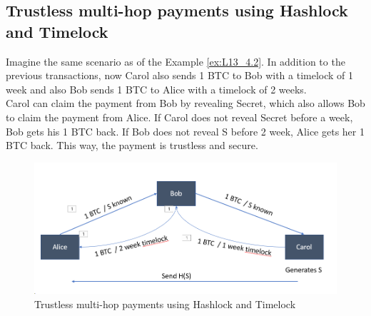 \subsection{Trustless multi-hop payments using Hashlock and Timelock}
Imagine the same scenario as of the Example \ref{ex:L13_4.2}. In addition to the previous transactions, now Carol also sends 1 BTC to Bob with a timelock of 1 week and also Bob sends 1 BTC to Alice with a timelock of 2 weeks. \\
Carol can claim the payment from Bob by revealing Secret, which also allows Bob to claim the payment from Alice. If Carol does not reveal Secret before a week, Bob gets his 1 BTC back. If Bob does not reveal S before 2 week, Alice gets her 1 BTC back. This way, the payment is trustless and secure.
\begin{figure}[h!]
	\centering
	\includegraphics[width=0.6\linewidth]{Fig/L13_F7}
	\caption{Trustless multi-hop payments using Hashlock and Timelock}
	\label{fig:L13_f7}
\end{figure}

